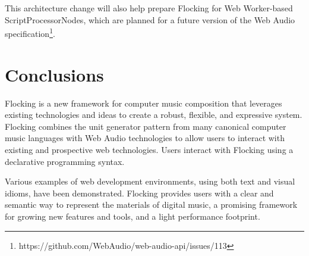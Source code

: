 \documentclass{article}
\begin{document}
This architecture change will also help prepare Flocking for Web Worker-based ScriptProcessorNodes, which are planned for a future version of the Web Audio specification\footnote{https://github.com/WebAudio/web-audio-api/issues/113}.

\section{Conclusions}

Flocking is a new framework for computer music composition that leverages existing technologies and ideas to create a robust, flexible, and expressive system. Flocking combines the unit generator pattern from many canonical computer music languages with Web Audio technologies to allow users to interact with existing and prospective web technologies. Users interact with Flocking using a declarative programming syntax.

Various examples of web development environments, using both text and visual idioms, have been demonstrated. Flocking provides users with a clear and semantic way to represent the materials of digital music, a promising framework for growing new features and tools, and a light performance footprint.



\end{document}
